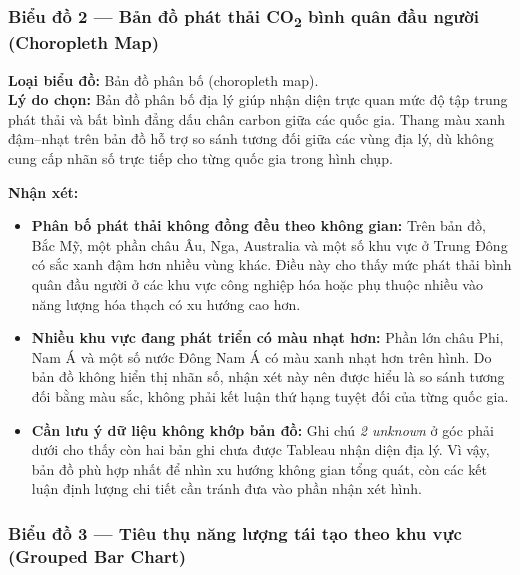 \subsubsection{Biểu đồ 2 --- Bản đồ phát thải CO\textsubscript{2} bình quân đầu người (Choropleth Map)}

\textbf{Loại biểu đồ:} Bản đồ phân bố (choropleth map).\\
\textbf{Lý do chọn:} Bản đồ phân bố địa lý giúp nhận diện trực quan mức độ tập trung phát thải và bất bình đẳng dấu chân carbon giữa các quốc gia. Thang màu xanh đậm--nhạt trên bản đồ hỗ trợ so sánh tương đối giữa các vùng địa lý, dù không cung cấp nhãn số trực tiếp cho từng quốc gia trong hình chụp.


\textbf{Nhận xét:}
\begin{itemize}
    \item \textbf{Phân bố phát thải không đồng đều theo không gian:} Trên bản đồ, Bắc Mỹ, một phần châu Âu, Nga, Australia và một số khu vực ở Trung Đông có sắc xanh đậm hơn nhiều vùng khác. Điều này cho thấy mức phát thải bình quân đầu người ở các khu vực công nghiệp hóa hoặc phụ thuộc nhiều vào năng lượng hóa thạch có xu hướng cao hơn.
    \item \textbf{Nhiều khu vực đang phát triển có màu nhạt hơn:} Phần lớn châu Phi, Nam Á và một số nước Đông Nam Á có màu xanh nhạt hơn trên hình. Do bản đồ không hiển thị nhãn số, nhận xét này nên được hiểu là so sánh tương đối bằng màu sắc, không phải kết luận thứ hạng tuyệt đối của từng quốc gia.
    \item \textbf{Cần lưu ý dữ liệu không khớp bản đồ:} Ghi chú \textit{2 unknown} ở góc phải dưới cho thấy còn hai bản ghi chưa được Tableau nhận diện địa lý. Vì vậy, bản đồ phù hợp nhất để nhìn xu hướng không gian tổng quát, còn các kết luận định lượng chi tiết cần tránh đưa vào phần nhận xét hình.
\end{itemize}

\subsubsection{Biểu đồ 3 --- Tiêu thụ năng lượng tái tạo theo khu vực (Grouped Bar Chart)}

